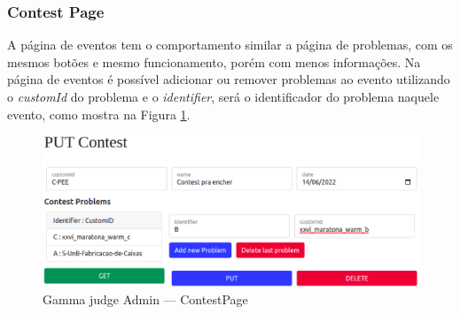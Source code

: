 \subsubsection{Contest Page}

A página de eventos tem o comportamento similar a página de problemas, com os mesmos botões e mesmo funcionamento, porém com menos informações. Na página de eventos é possível adicionar ou remover problemas ao evento utilizando o \textit{customId} do problema e o \textit{identifier}, será o identificador do problema naquele evento, como mostra na Figura \ref{fig:judge_admin_contest}.

\begin{figure}[H]
    \centering
    \includegraphics[keepaspectratio=true,scale=0.45]{figuras/contest_page.eps}
    \caption{Gamma judge Admin — ContestPage}
    \label{fig:judge_admin_contest}
\end{figure}